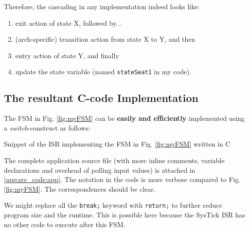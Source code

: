 \documentclass[12pt,a4paper]{scrartcl}
\begin{document}
	Therefore, the cascading in any implementation indeed looks like:
	\begin{enumerate}
		\item exit action of state X, followed by...
		\item (arch-specific) transition action from state X to Y, and then
		\item entry action of state Y, and finally
		\item update the state variable (named \texttt{stateSeat1} in my code).
	\end{enumerate}

	\subsection{The resultant C-code Implementation}
	The FSM in Fig. \ref{fig:myFSM} can be 
	\textbf{easily and efficiently} implemented using a \textit{switch}-construct
	as follows:
	
	\begin{codeline}{Snippet of the ISR implementing the FSM in Fig. \ref{fig:myFSM} written in C}
		
		\tcblower
		The complete application source file (with more inline comments, variable declarations and overhead of polling input values) is attached in \ref{app:src_code:app}.
		The notation in the code is more verbose compared to Fig. \ref{fig:myFSM}.
		The correspondences should be clear.
	\end{codeline}

	We might replace all the \texttt{break;} keyword with \texttt{return;} 
	to further reduce program size and the runtime. 
	This is possible here because the SysTick ISR 
	has no other code to execute after this FSM.
\end{document}
